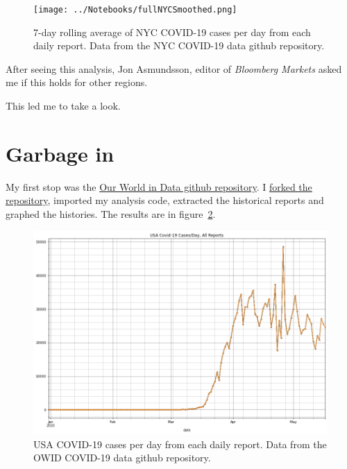 \documentclass[10pt,reqno]{amsart}
\begin{document}
\begin{figure}[H]
  \centering
  \texttt{[image: ../Notebooks/fullNYCSmoothed.png]}
  \caption{7-day rolling average of NYC COVID-19 cases per day from each daily report.  Data
    from the NYC COVID-19 data github repository.}
  \label{fig:smoothDaily}
\end{figure}

After seeing this analysis, Jon Asmundsson, editor of {\it Bloomberg
  Markets} asked me if this holds for other regions.\cite{Asmundsson2020Dates}

This led me to take a look.

\section{Garbage in}
My first stop was the
\href{https://github.com/owid/covid-19-data}{Our World in Data github
  repository}\nocite{owid2020data}.  I
\href{https://github.com/hjstein/covid-19-data}{forked the
  repository}, imported my analysis code, extracted the historical
reports and graphed the histories.  The results are in figure~\ref{fig:owid}.

\begin{figure}[H]
  \centering
  \includegraphics[width=\textwidth]{../Notebooks/USACasesPerDayRawNoLegend.png}
  \caption{USA COVID-19 cases per day from each daily report.  Data
    from the OWID COVID-19 data github repository.}
  \label{fig:owid}
\end{figure}
\end{document}
